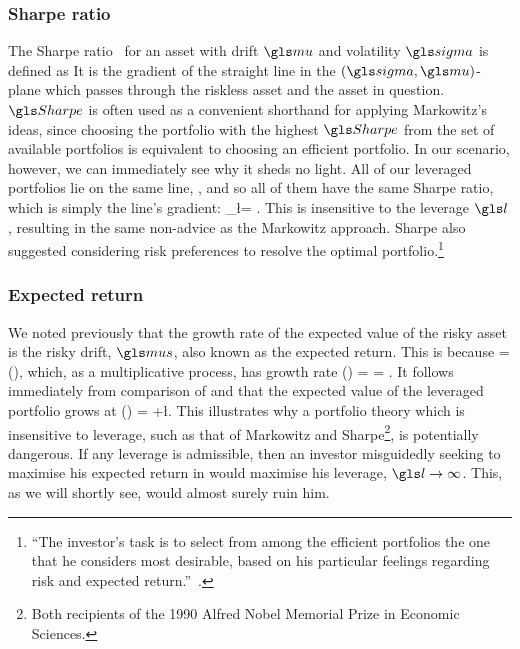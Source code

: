 \subsubsection{Sharpe ratio}
The Sharpe ratio~\cite{Sharpe1966} for an asset with drift $\gmu$ and volatility $\gsigma$ is defined as
\be
\Sharpe\equiv\frac{\gmu-\mur}{\gsigma}
\ee
It is the gradient of the straight line in the $(\gsigma, \gmu)$-plane which passes through the riskless asset and the asset in question. $\Sharpe$ is often used as a convenient shorthand for applying Markowitz's ideas, since choosing the portfolio with the highest $\Sharpe$ from the set of available portfolios is equivalent to choosing an efficient portfolio. In our scenario, however, we can immediately see why it sheds no light. All of our leveraged portfolios lie on the same line, , and so all of them have the same Sharpe ratio, which is simply the line's gradient:
\be
\Sharpe_\l = \frac{\mue}{\sigmas}.
\ee
This is insensitive to the leverage $\l$, resulting in the same non-advice as the Markowitz approach. Sharpe also suggested considering risk preferences to resolve the optimal portfolio.\footnote{``The investor's task is to select from among the efficient portfolios the one that he considers most desirable, based on his particular feelings regarding risk and expected return.''~\cite{Sharpe1966}.}

\subsubsection{Expected return}
We noted previously that the growth rate of the expected value of the risky asset is the risky drift, $\mus$, also known as the expected return. This is because
\be
\ave{\xone(\tn+\Dt)} = \ave{\xone(\tn)}\exp(\mus \Dt),
\ee
which, as a multiplicative process, has growth rate
\be
\gm(\ave{\xone}) = \frac{\D\ln\ave{\xone}}{\Dt} = \mus.
\ee
It follows immediately from comparison of  and  that the expected value of the leveraged portfolio grows at
\be
\gm(\ave{\xl}) = \mur+\l\mue.
\ee
This illustrates why a portfolio theory which is insensitive to leverage, such as that of Markowitz and Sharpe\footnote{Both recipients of the 1990 Alfred Nobel Memorial Prize in Economic Sciences.}, is potentially dangerous. If any leverage is admissible, then an investor misguidedly seeking to maximise his expected return in  would maximise his leverage, $\l\to\infty$. This, as we will shortly see, would almost surely ruin him.


